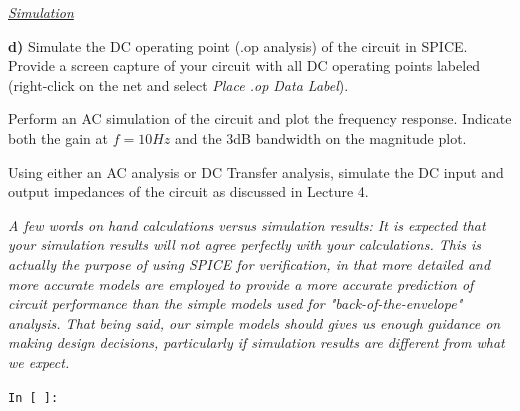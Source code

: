 \documentclass[11pt]{article}
\begin{document}
\vspace{2em}

\noindent \underline{\textit{Simulation}}

\vspace{1em}

\noindent \textbf{d)} Simulate the DC operating point (.op analysis) of the circuit in SPICE. Provide a screen capture of your circuit with all DC operating points labeled (right-click on the net and select \textit{Place .op Data Label}).

\vspace{1em}

\noindent Perform an AC simulation of the circuit and plot the frequency response. Indicate both the gain at $f = 10Hz$ and the 3dB bandwidth on the magnitude plot.

\vspace{1em}

\noindent Using either an AC analysis or DC Transfer analysis, simulate the DC input and output impedances of the circuit as discussed in Lecture 4.

\vspace{2em}

\noindent \textit{A few words on hand calculations versus simulation results: It is expected that your simulation results will not agree perfectly with your calculations. This is actually the purpose of using SPICE for verification, in that more detailed and more accurate models are employed to provide a more accurate prediction of circuit performance than the simple models used for "back-of-the-envelope" analysis. That being said, our simple models should gives us enough guidance on making design decisions, particularly if simulation results are different from what we expect.}

\vspace{1.5em}

\noindent \texttt{In [ ]:}
\end{document}
